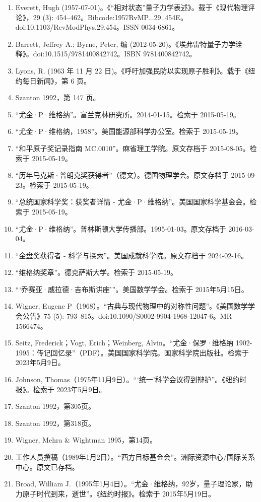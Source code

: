 \begin{enumerate}
\item Everett, Hugh (1957-07-01)。《“相对状态”量子力学表述》。载于《现代物理评论》，29 (3): 454–462。Bibcode:1957RvMP...29..454E。doi:10.1103/RevModPhys.29.454。ISSN 0034-6861。
\item Barrett, Jeffrey A.; Byrne, Peter, 编 (2012-05-20)。《埃弗雷特量子力学诠释》。doi:10.1515/9781400842742。ISBN 9781400842742。
\item Lyons, R. (1963 年 11 月 22 日)。《呼吁加强民防以实现原子胜利》。载于《纽约每日新闻》，第 6 页。
\item Szanton 1992，第 147 页。
\item “尤金·P·维格纳”。富兰克林研究所。2014-01-15。检索于 2015-05-19。
\item “尤金·P·维格纳，1958”。美国能源部科学办公室。检索于 2015-05-19。
\item “和平原子奖记录指南 MC.0010”。麻省理工学院。原文存档于 2015-08-05。检索于 2015-05-19。
\item “历年马克斯·普朗克奖获得者”（德文）。德国物理学会。原文存档于 2015-09-23。检索于 2015-05-19。
\item “总统国家科学奖：获奖者详情 - 尤金·P·维格纳”。美国国家科学基金会。检索于 2015-05-19。
\item “尤金·P·维格纳”。普林斯顿大学传播部。1995-01-03。原文存档于 2016-03-04。
\item “金盘奖获得者 - 科学与探索”。美国成就科学院。原文存档于 2024-02-16。
\item “维格纳奖章”。德克萨斯大学。检索于 2015-05-19。
\item “‘乔赛亚·威拉德·吉布斯讲座’”。美国数学学会。检索于 2015年5月15日。
\item Wigner, Eugene P（1968）。“古典与现代物理中的对称性问题”。《美国数学学会公告》75 (5): 793–815。doi:10.1090/S0002-9904-1968-12047-6。MR 1566474。
\item Seitz, Frederick；Vogt, Erich；Weinberg, Alvin。“尤金·保罗·维格纳 1902-1995：传记回忆录”（PDF）。美国国家科学院。国家科学院出版社。检索于 2023年5月9日。
\item Johnson, Thomas（1975年11月9日）。“‘统一’科学会议得到辩护”。《纽约时报》。检索于 2023年5月9日。
\item Szanton 1992，第305页。
\item Szanton 1992，第318页。
\item Wigner, Mehra & Wightman 1995，第14页。
\item 工作人员撰稿（1989年1月2日）。“西方目标基金会”。洲际资源中心/国际关系中心。原文已存档。
\item Broad, William J.（1995年1月4日）。“尤金·维格纳，92岁，量子理论家，助力原子时代到来，逝世”。《纽约时报》。检索于 2015年5月19日。


\end{enumerate}